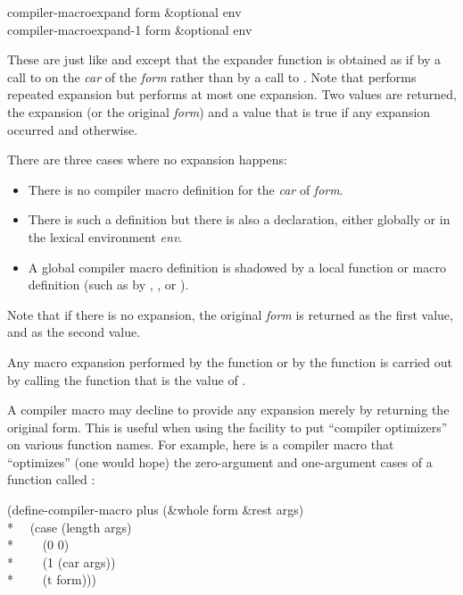 \begin{defun}[Function]
compiler-macroexpand form &optional env \\
compiler-macroexpand-1 form &optional env

  These are just like  and 
  except that the expander function is obtained as if by a call to
   on the \emph{car} of the \emph{form} rather than by a call to
  .
  Note that  performs repeated expansion
  but  performs at most one expansion.
  Two values are returned, the expansion (or the original \emph{form})
  and a value that is true if any expansion occurred and  otherwise.

  There are three cases where no expansion happens:
  \begin{itemize}
    \item There is no compiler macro definition for the \emph{car} of \emph{form}.
    \item There is such a definition but there is also a 
        declaration, either globally or in the lexical environment \emph{env}.
    \item A global compiler macro definition is shadowed by a local
        function or macro definition (such as by , , or
        ).
  \end{itemize}
  Note that if there is no expansion, the original \emph{form} is returned as
  the first value, and  as the second value.
  
  Any macro expansion performed by the function 
  or by the function  is carried out
  by calling the function that is the value of .

A compiler macro may decline to provide any expansion merely
by returning the original form. This is useful when using the facility
to put ``compiler optimizers'' on various function names.  For example,
here is a compiler macro that ``optimizes'' (one would hope)
the zero-argument and one-argument cases of
a function called :
\begin{lisp}
(define-compiler-macro plus (\&whole form \&rest args) \\*
~~(case (length args) \\*
~~~~(0 0) \\*
~~~~(1 (car args)) \\*
~~~~(t form)))
\end{lisp}
\end{defun}

